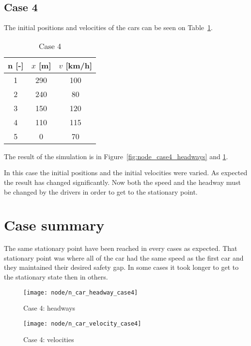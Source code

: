 		\subsection*{Case 4}
		The initial positions and velocities of the cars can be seen on Table~\ref{tab:node_case4}.
		\begin{table}
			\centering
			\begin{tabular}{ |c|c|c| }
				\hline
				n [-] & $x$ [m] & $v$ [km/h]\\
				\hline
				1 & 290 & 100 \\
				2 & 240 & 80 \\
				3 & 150 & 120 \\
				4 & 110& 115 \\
				5 & 0 & 70 \\
				\hline
			\end{tabular}
			\caption{Case 4}
			\label{tab:node_case4}
		\end{table}
		The result of the simulation is in Figure~\ref{fig:node_case4_headways} and \ref{fig:node_case4_velocities}. 

		In this case the initial positions and the initial velocities were varied. As expected the result has changed significantly. Now both the speed and the headway must be changed by the drivers in order to get to the stationary point.
		\section*{Case summary}
		The same stationary point have been reached in every cases as expected. That stationary point was where all of the car had the same speed as the first car and they maintained their desired safety gap. In some cases it took longer to get to the stationary state then in others.
		\begin{figure}
			\centering
			\begin{minipage}{.5\textwidth}
				\centering
				\texttt{[image: node/n\_car\_headway\_case4]}
				\caption{Case 4: headways}
				\label{fig:node_case4_headways}
			\end{minipage}\hfill
			\begin{minipage}{.5\textwidth}
				\centering
				\texttt{[image: node/n\_car\_velocity\_case4]}
				\caption{Case 4: velocities}
				\label{fig:node_case4_velocities}
			\end{minipage}
		\end{figure}
